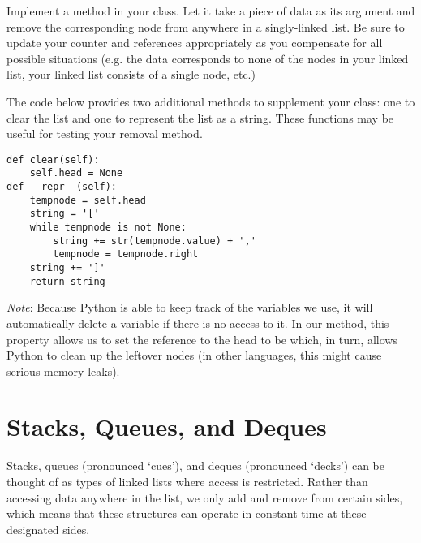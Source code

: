 \begin{problem}
Implement a  method in your  class.
Let it take a piece of data as its argument and remove the corresponding node from anywhere in a singly-linked list.
Be sure to update your counter and references appropriately as you compensate for all possible situations (e.g. the data corresponds to none of the nodes in your linked list, your linked list consists of a single node, etc.)

The code below provides two additional methods to supplement your  class: one to clear the list and one to represent the list as a string.
These functions may be useful for testing your removal method.
\begin{lstlisting}
def clear(self):
    self.head = None
def __repr__(self):
    tempnode = self.head
    string = '['
    while tempnode is not None:
        string += str(tempnode.value) + ','
        tempnode = tempnode.right
    string += ']'
    return string
\end{lstlisting}
\emph{Note}: Because Python is able to keep track of the variables we use, it will automatically delete a variable if there is no access to it.
In our  method, this property allows us to set the reference to the head to be  which, in turn, allows Python to clean up the leftover nodes (in other languages, this might cause serious memory leaks).
\label{prob:LinkedList}
\end{problem}

\section*{Stacks, Queues, and Deques}
Stacks, queues (pronounced `cues'), and deques (pronounced `decks') can be thought of as types of linked lists where access is restricted.
Rather than accessing data anywhere in the list, we only add and remove from certain sides, which means that these structures can operate in constant time at these designated sides.

